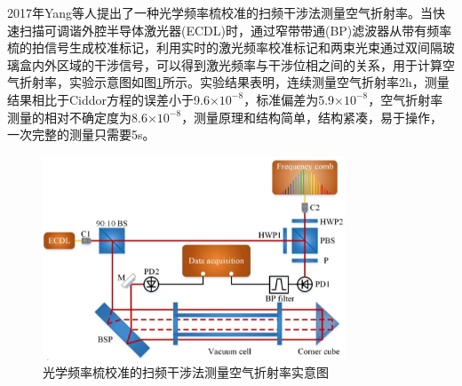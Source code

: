2017年Yang等人提出了一种光学频率梳校准的扫频干涉法测量空气折射率。当快速扫描可调谐外腔半导体激光器(ECDL)时，通过窄带带通(BP)滤波器从带有频率梳的拍信号生成校准标记，利用实时的激光频率校准标记和两束光束通过双间隔玻璃盒内外区域的干涉信号，可以得到激光频率与干涉位相之间的关系，用于计算空气折射率，实验示意图如图\ref{fig:光学频率梳校准的扫频干涉法测量空气折射率实意图}所示\cite{2017Frequency}。实验结果表明，连续测量空气折射率2h，测量结果相比于Ciddor方程的误差小于9.6$\times 10^{-8}$，标准偏差为5.9$\times 10^{-8}$，空气折射率测量的相对不确定度为8.6$\times 10^{-8}$，测量原理和结构简单，结构紧凑，易于操作，一次完整的测量只需要5s。
\begin{figure}[htb]
  \centering
  \includegraphics[width=9cm]{fig/1-fig/光学频率梳校准的扫频干涉法测量空气折射率实意图.jpg}
  \caption{光学频率梳校准的扫频干涉法测量空气折射率实意图}
  \label{fig:光学频率梳校准的扫频干涉法测量空气折射率实意图}
\end{figure}

